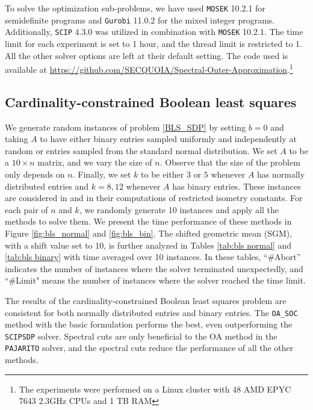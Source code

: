\documentclass{article}
\begin{document}
To solve the optimization sub-problems, we have used \texttt{MOSEK} 10.2.1 \cite{mosek} for semidefinite programs and \texttt{Gurobi} 11.0.2 \cite{optimization2020gurobi} for the mixed integer programs. Additionally, \texttt{SCIP} 4.3.0 was utilized in combination with \texttt{MOSEK} 10.2.1. The time limit for each experiment is set to 1 hour, and the thread limit is restricted to 1. All the other solver options are left at their default setting. The code used is available at
\url{https://github.com/SECQUOIA/Spectral-Outer-Approximation}.\footnote{The experiments were performed on a Linux cluster with 48 AMD EPYC 7643
2.3GHz CPUs and 1 TB RAM}


\subsection{Cardinality-constrained Boolean least squares}


We generate random instances of problem \eqref{BLS_SDP} by setting $b =0$ and taking $A$ to have either binary entries sampled uniformly and independently at random or entries sampled from the standard normal distribution. We set $A$ to be a $10 \times n$ matrix, and we vary the size of $n$. Observe that the size of the problem only depends on $n$. Finally, we set $k$ to be either $3$ or $5$ whenever $A$ has normally distributed entries and $k= 8,12 $ whenever $A$ has binary entries. These instances are considered in \cite{gally2016computing} and \cite{kobayashi2020branch} in their computations of restricted isometry constants. For each pair of $n$ and $k$, we randomly generate 10 instances and apply all the methods to solve them. We present the time performance of these methods in Figure \ref{fig:bls_normal} and \ref{fig:bls_bin}. The shifted geometric mean (SGM), with a shift value set to 10, is further analyzed in Tables \ref{tab:bls normal} and \ref{tab:bls binary} with time averaged over 10 instances. 
In these tables, ``\#Abort'' indicates the number of instances where the solver terminated unexpectedly, and ``\#Limit" means the number of instances where the solver reached the time limit.

The results of the cardinality-constrained Boolean least squares problem are consistent for both normally distributed entries and binary entries.
The \texttt{OA\_SOC} method with the basic formulation performs the best, even outperforming the \texttt{SCIPSDP} solver. Spectral cuts are only beneficial to the OA method in the \texttt{PAJARITO} solver, and the spectral cuts reduce the performance of all the other methods.
\end{document}
